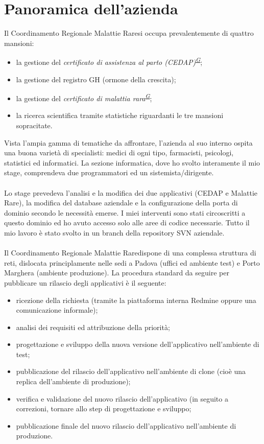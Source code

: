 \documentclass[a4paper]{article}
\newcommand{\crmr}{Coordinamento Regionale Malattie Rare}
\begin{document}
\section{Panoramica dell'azienda}
Il \crmr si occupa prevalentemente di quattro mansioni:
\begin{itemize}
	\item la gestione del \textit{certificato di assistenza al parto (CEDAP)\textsuperscript{\hyperref[sec:gl]{G}}};
    \item la gestione del registro GH (ormone della crescita);
    \item la gestione del \textit{certificato di malattia rara\textsuperscript{\hyperref[sec:gl]{G}}};
    \item la ricerca scientifica tramite statistiche riguardanti le tre mansioni sopracitate.
\end{itemize}
Vista l'ampia gamma di tematiche da affrontare, l'azienda al suo interno ospita una buona varietà di specialisti: medici di ogni tipo, farmacisti, psicologi, statistici ed informatici. La sezione informatica, dove ho svolto interamente il mio stage, comprendeva due programmatori ed un sistemista/dirigente.
\\ \\
Lo stage prevedeva l'analisi e la modifica dei due applicativi (CEDAP e Malattie Rare), la modifica del database aziendale e la configurazione della porta di dominio secondo le necessità emerse. I miei interventi sono stati circoscritti a questo dominio ed ho avuto accesso solo alle aree di codice necessarie. Tutto il mio lavoro è stato svolto in un branch della repository SVN aziendale.
\\ \\
Il \crmr dispone di una complessa struttura di reti, dislocata principlamente nelle sedi a Padova (uffici ed ambiente test) e Porto Marghera (ambiente produzione). La procedura standard da seguire per pubblicare un rilascio degli applicativi è il seguente:
\begin{itemize}
	\item ricezione della richiesta (tramite la piattaforma interna Redmine oppure una comunicazione informale);
    \item analisi dei requisiti ed attribuzione della priorità;
    \item progettazione e sviluppo della nuova versione dell'applicativo nell'ambiente di test;
    \item pubblicazione del rilascio dell'applicativo nell'ambiente di clone (cioè una replica dell'ambiente di produzione);
    \item verifica e validazione del nuovo rilascio dell'applicativo (in seguito a correzioni, tornare allo step di progettazione e sviluppo;
    \item pubblicazione finale del nuovo rilascio dell'applicativo nell'ambiente di produzione.
\end{itemize}
\end{document}

